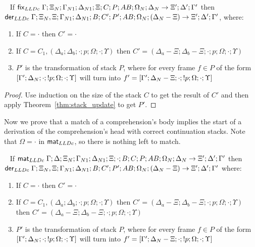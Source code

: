 \begin{theorem}\label{thm:from_update_to_derivation}
~\newline
If $\mathsf{fix}_{LLDc} \; \Gamma; \Xi_N; \Gamma_{N1}; \Delta_{N1}; \Xi; C; P; AB; \Omega_N;
\Delta_N \rightarrow \Xi'; \Delta'; \Gamma'$ then\\
\texttab$\mathsf{der}_{LLDc} \; \Gamma; \Xi_N, \Xi;
\Gamma_{N1}; \Delta_{N1}; B; C' ; P'; AB; \Omega_N; (\Delta_N - \Xi) \rightarrow
\Xi'; \Delta'; \Gamma'$, where:

\begin{enumerate}
   \item If $C = \cdot$ then $C' = \cdot$

   \item If $C = C_1, (\Delta_a; \Delta_b; \cdot; p; \Omega; \cdot; \Upsilon)$
   then $C' = (\Delta_a - \Xi; \Delta_b - \Xi; \cdot; p; \Omega; \cdot;
         \Upsilon)$

   \item $P'$ is the transformation of stack $P$, where for every frame $f \in
   P$ of the form $[\Gamma'; \Delta_N; \cdot; {!} p; \Omega; \cdot; \Upsilon]$
   will turn into $f' = [\Gamma';\Delta_N-\Xi;\cdot;{!} p;\Omega;\cdot;\Upsilon]$

\end{enumerate}
\end{theorem}
\begin{proof}
Use induction on the size of the stack $C$ to get the result of $C'$ and then
apply Theorem~\ref{thm:stack_update} to get $P'$.
\end{proof}


Now we prove that a match of a comprehension's body implies the start of a
derivation of the comprehension's head with correct continuation stacks. Note
that $\Omega = \cdot$ in $\mathsf{mat}_{LLDc}$, so there is nothing left to match.

\begin{corollary}\label{thm:match_to_derivation}
~\newline
If $\mathsf{mat}_{LLDc} \; \Gamma; \Delta; \Xi_N; \Gamma_{N1}; \Delta_{N1}; \Xi; \cdot; B; C; P;
AB;\Omega_N; \Delta_N \rightarrow \Xi'; \Delta'; \Gamma'$ then\\
\texttab$\mathsf{der}_{LLDc} \; \Gamma; \Xi_N, \Xi; \Gamma_{N1}; \Delta_{N1}; B; C'; P'; AB; \Omega_N; (\Delta_N - \Xi) \rightarrow \Xi'; \Delta'; \Gamma'$ where:
   
\begin{enumerate}
   \item If $C = \cdot$ then $C' = \cdot$
   \item If $C = C_1, (\Delta_a; \Delta_b; \cdot; p; \Omega; \cdot; \Upsilon)$ then $C' = (\Delta_a - \Xi; \Delta_b - \Xi; \cdot; p; \Omega; \cdot; \Upsilon)$ then \linebreak $C' = (\Delta_a - \Xi; \Delta_b - \Xi; \cdot; p; \Omega; \cdot; \Upsilon)$
   \item $P'$ is the transformation of stack $P$, where for every frame $f \in
   P$ of the form $[\Gamma'; \Delta_N; \cdot; {!} p; \Omega; \cdot; \Upsilon]$
   will turn into $f' = [\Gamma';\Delta_N-\Xi;\cdot;{!} p;\Omega;\cdot;\Upsilon]$
\end{enumerate}
\end{corollary}

